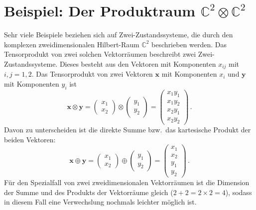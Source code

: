 \section{Beispiel: Der Produktraum $\mathbb{C}^2 \otimes \mathbb{C}^2$}
\label{sec_Entanglement_Produkt}

Sehr viele Beispiele beziehen sich auf Zwei-Zustandssysteme, die durch 
den komplexen zweidimensionalen Hilbert-Raum $\mathbb{C}^2$ beschrieben
werden. Das Tensorprodukt von zwei solchen Vektorr\"aumen beschreibt
zwei Zwei-Zustandssysteme. Dieses besteht aus den Vektoren
mit Komponenten $x_{ij}$ mit $i,j=1,2$. Das Tensorprodukt von zwei
Vektoren $\pmb{x}$ mit Komponenten $x_i$ und $\pmb{y}$ mit Komponenten
$y_i$ ist
\begin{equation}
       \pmb{x} \otimes \pmb{y} = \left( \begin{array}{c} x_1 \\ x_2 \end{array} \right)
       \otimes  \left( \begin{array}{c} y_1 \\ y_2 \end{array} \right) =
        \left( \begin{array}{c} x_1 y_1 \\ x_1y_2 \\ x_2 y_1 \\ x_2 y_2 \end{array} \right) \, .
\end{equation}
Davon zu unterscheiden ist die direkte Summe bzw.\ das kartesische Produkt
der beiden Vektoren:
\begin{equation}
       \pmb{x} \oplus \pmb{y} = \left( \begin{array}{c} x_1 \\ x_2 \end{array} \right)
       \oplus  \left( \begin{array}{c} y_1 \\ y_2 \end{array} \right) =
        \left( \begin{array}{c} x_1 \\ x_2 \\  y_1 \\  y_2 \end{array} \right) \, .
\end{equation}
F\"ur den Spezialfall von zwei zweidimensionalen Vektorr\"aumen ist die 
Dimension der Summe und des Produkts der Vektorr\"aume gleich
($2+2=2\times 2=4$), sodass in diesem Fall eine Verwechslung nochmals leichter
m\"oglich ist. 

